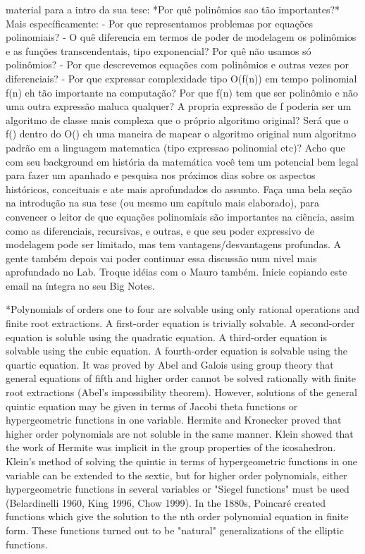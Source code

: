 {material para a intro da sua tese:
*Por quê polinômios sao tão importantes?*
Mais específicamente:
- Por que representamos problemas por equações polinomiais?
- O quê diferencia em termos de poder de modelagem os polinômios e as
funções transcendentais, tipo exponencial? Por quê não usamos só polinômios?
- Por que descrevemos equações com polinômios e outras vezes por
diferenciais?
- Por que expressar complexidade tipo O(f(n)) em tempo polinomial f(n) eh
tão importante na computação? Por que f(n) tem que ser polinômio e não uma
outra expressão maluca qualquer? A propria expressão de f poderia ser um
algoritmo de classe mais complexa que o próprio algoritmo original? Será
que o f() dentro do O() eh uma maneira de mapear o algoritmo original num
algoritmo padrão em a linguagem matematica (tipo expressao polinomial etc)?
Acho que com seu background em história da matemática você tem um potencial
bem legal para fazer um apanhado e pesquisa nos próximos dias sobre os
aspectos históricos, conceituais e ate mais aprofundados do assunto. Faça
uma bela seção na introdução na sua tese (ou mesmo um capítulo mais
elaborado), para convencer o leitor de que equações polinomiais são
importantes na ciência, assim como as diferenciais, recursivas, e outras, e
que seu poder expressivo de modelagem pode ser limitado, mas tem
vantagens/desvantagens profundas.
A gente também depois vai poder continuar essa discussão num nivel mais
aprofundado no Lab. Troque idéias com o Mauro também. Inicie copiando este email na íntegra no seu Big Notes.}

 *Polynomials of orders one to four are solvable using only rational operations and finite root extractions. A first-order equation is trivially solvable. A second-order equation is soluble using the quadratic equation. A third-order equation is solvable using the cubic equation. A fourth-order equation is solvable using the quartic equation. It was proved by Abel and Galois using group theory that general equations of fifth and higher order cannot be solved rationally with finite root extractions (Abel's impossibility theorem).
However, solutions of the general quintic equation may be given in terms of Jacobi theta functions or hypergeometric functions in one variable. Hermite and Kronecker proved that higher order polynomials are not soluble in the same manner. Klein showed that the work of Hermite was implicit in the group properties of the icosahedron. Klein's method of solving the quintic in terms of hypergeometric functions in one variable can be extended to the sextic, but for higher order polynomials, either hypergeometric functions in several variables or "Siegel functions" must be used (Belardinelli 1960, King 1996, Chow 1999). In the 1880s, Poincaré created functions which give the solution to the nth order polynomial equation in finite form. These functions turned out to be "natural" generalizations of the elliptic functions.

